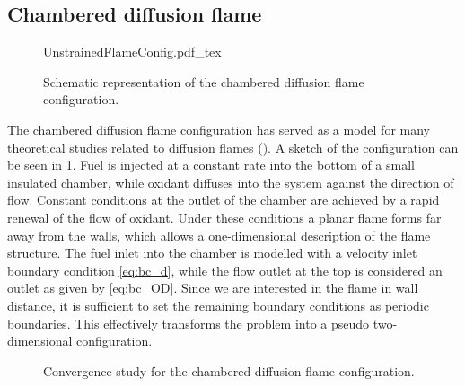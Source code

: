 
\subsection{Chambered diffusion flame}\label{ss:UDF}
\begin{figure}[b]
	\begin{center}
		\def\svgwidth{0.4\textwidth}
		{UnstrainedFlameConfig.pdf_tex}
		\caption{Schematic representation of the chambered diffusion flame configuration. }
		\label{fig:chamberedDifFlame}
	\end{center}
\end{figure}

The chambered diffusion flame configuration has served as a model for many theoretical studies related to diffusion flames (\cite{matalonEffectThermalExpansion2010,rameauNumericalBifurcationChambered1985,matalonDiffusionFlamesChamber1980}). A sketch of the configuration can be seen in \cref{fig:chamberedDifFlame}. Fuel is injected at a constant rate into the bottom of a small insulated chamber, while oxidant diffuses into the system against the direction of flow. Constant conditions at the outlet of the chamber are achieved by a rapid renewal of the flow of oxidant.  Under these conditions a planar flame forms far away from the walls, which allows a one-dimensional description of the flame structure.
The fuel inlet into the chamber is modelled with a velocity inlet boundary condition \cref{eq:bc_d}, while the flow outlet at the top is considered an outlet as given by \cref{eq:bc_OD}. Since we are interested in the flame in wall distance, it is sufficient to set the remaining boundary conditions as periodic boundaries. This effectively transforms the problem into a pseudo two-dimensional configuration.


\begin{figure}[t!]
	\centering
	\pgfplotsset{width=0.34\textwidth, compat=1.3}
	\caption{Convergence study for the chambered diffusion flame configuration.}
	\label{ConvergenceDiffFlame}
\end{figure}

